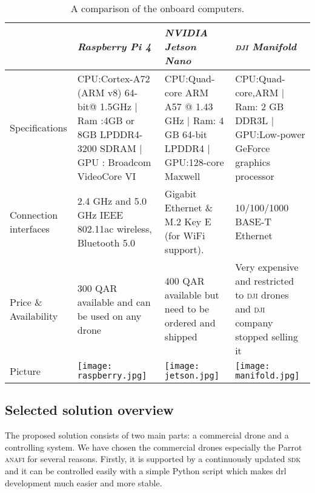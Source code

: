 \documentclass[../main.tex]{subfiles}
\begin{document}
\begin{table}[H]
    \centering
    \caption{A comparison of the onboard computers.}
    \label{tab:onboard-computers}  
    \begin{tabular}{ p{3cm} p{4cm} p{4cm} p{4cm} }
        \toprule
        \textit{} & \textit{Raspberry Pi 4} & \textit{NVIDIA Jetson Nano} & \textit{\textsc{dji} Manifold}\\ \midrule
        Specifications  & CPU:Cortex-A72 (ARM v8) 64-bit@ 1.5GHz | Ram :4GB or 8GB LPDDR4-3200 SDRAM | GPU : Broadcom VideoCore VI & CPU:Quad-core ARM A57 @ 1.43 GHz | Ram: 4 GB 64-bit LPDDR4   | GPU:128-core Maxwell & CPU:Quad-core,ARM | Ram: 2 GB DDR3L | GPU:Low-power GeForce graphics processor \\ \addlinespace
        Connection interfaces & 2.4 GHz and 5.0 GHz IEEE 802.11ac wireless, Bluetooth 5.0 & Gigabit Ethernet \& M.2 Key E (for WiFi support). &10/100/1000 BASE-T Ethernet \\ \addlinespace

        Price \& Availability & 300 QAR available and can be used on any drone & 400 QAR available but need to be ordered and shipped & Very expensive and restricted to \textsc{dji} drones and \textsc{dji} company stopped selling it \\ \addlinespace
        Picture & \begin{minipage}{.2\textwidth}
            \texttt{[image: raspberry.jpg]}
            \end{minipage}  & \begin{minipage}{.2\textwidth}
            \texttt{[image: jetson.jpg]}
            \end{minipage} & \begin{minipage}{.2\textwidth}
            \texttt{[image: manifold.jpg]}
        \end{minipage} \\
        \bottomrule
        \end{tabular}
    \end{table}

\subsection{Selected solution overview}\label{sec:selected-solution}

The proposed solution consists of two main parts: 
a commercial drone and a controlling system.
We have chosen the commercial drones especially 
the Parrot \textsc{anafi} for several reasons.
Firstly, it is supported by a continuously updated 
\textsc{sdk} and it can be controlled easily 
with a simple Python script which makes 
\gls{drl} development much easier and more stable. 
\end{document}
